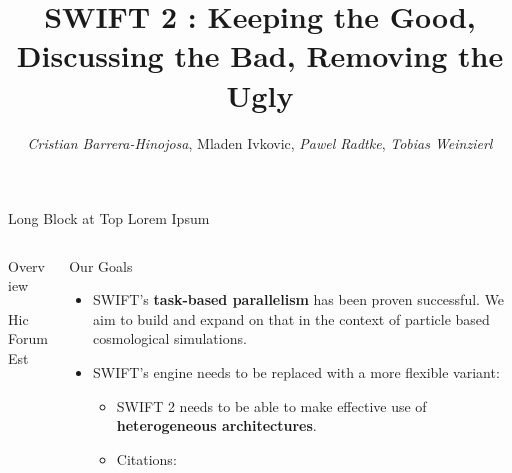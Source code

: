 \documentclass{beamer}
\author[mladen.ivkovic@durham.ac.uk]{\textit{\textmd{Cristian Barrera-Hinojosa}}, \textmd{Mladen
Ivkovic}, \textit{\textmd{Pawel Radtke}}, \textit{\textmd{Tobias Weinzierl}}}
\title{SWIFT 2 : Keeping the Good, Discussing the Bad, Removing the Ugly}
\institute{Durham University}
\begin{document}
\begin{frame}[fragile]\centering




\begin{block}{Long Block at Top}
    Lorem Ipsum
\end{block}




\begin{columns}[T]



\begin{column}{.48\textwidth}

\begin{block}{Overview}

Hic Forum Est

\end{block}

\end{column}






\begin{column}{.48\textwidth}






\begin{block}{Our Goals}

\begin{itemize}
\item SWIFT's \textbf{task-based parallelism} has been proven successful. We aim to build and
expand on that in the context of particle based cosmological simulations.
\item SWIFT's engine needs to be replaced with a more flexible variant:
\begin{itemize}
 \item SWIFT 2 needs to be able to make effective use of \textbf{heterogeneous architectures}.
 \item Citations: \citet{weinzierlTwoParticleingridRealisations2016} \citet{reinarzExaHyPEEngineParallel2020} \citep{schayeFLAMINGOProjectCosmological2023}
\end{itemize}
\end{itemize}


\end{block}
\end{column}
\end{columns}
\end{frame}
\end{document}
